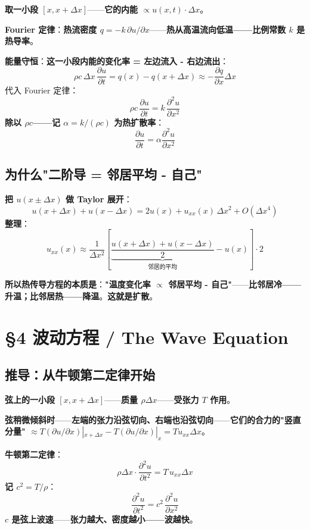 \textbf{取一小段 $[x, x+\Delta x]$}——\textbf{它的内能 $\propto u(x, t) \cdot \Delta x$}。

\textbf{Fourier 定律}：\textbf{热流密度 $q = -k \, \partial u / \partial x$}——\textbf{热从高温流向低温——比例常数 $k$ 是热导率}。

\textbf{能量守恒}：\textbf{这一小段内能的变化率 = 左边流入 - 右边流出}：
\[
\rho c \, \Delta x \, \frac{\partial u}{\partial t} = q(x) - q(x+\Delta x) \approx -\frac{\partial q}{\partial x} \Delta x
\]
代入 Fourier 定律：
\[
\rho c \, \frac{\partial u}{\partial t} = k \, \frac{\partial^2 u}{\partial x^2}
\]
\textbf{除以 $\rho c$——记 $\alpha = k/(\rho c)$ 为\textbf{热扩散率}}：
\begin{equation}
\boxed{\, \frac{\partial u}{\partial t} = \alpha \frac{\partial^2 u}{\partial x^2} \,}
\end{equation}

\subsection{为什么"二阶导 = 邻居平均 - 自己"}

\textbf{把 $u(x \pm \Delta x)$ 做 Taylor 展开}：
\[
u(x+\Delta x) + u(x-\Delta x) = 2 u(x) + u_{xx}(x) \, \Delta x^2 + O(\Delta x^4)
\]
\textbf{整理}：
\[
u_{xx}(x) \approx \frac{1}{\Delta x^2} \left[ \underbrace{\frac{u(x+\Delta x) + u(x-\Delta x)}{2}}_{\text{邻居的平均}} - u(x) \right] \cdot 2
\]

\textbf{所以热传导方程的本质是}：\textbf{"温度变化率 $\propto$ 邻居平均 - 自己"}——\textbf{比邻居冷——升温；比邻居热——降温}。\textbf{这就是扩散}。

\section{§4 波动方程 / The Wave Equation}

\subsection{推导：从牛顿第二定律开始}

\textbf{弦上的一小段 $[x, x+\Delta x]$}——\textbf{质量 $\rho \Delta x$}——\textbf{受张力 $T$ 作用}。

\textbf{弦稍微倾斜时}——\textbf{左端的张力沿弦切向、右端也沿弦切向}——\textbf{它们的合力的"竖直分量" $\approx T(\partial u/\partial x)|_{x+\Delta x} - T(\partial u/\partial x)|_x = T u_{xx} \Delta x$}。

\textbf{牛顿第二定律}：
\[
\rho \Delta x \cdot \frac{\partial^2 u}{\partial t^2} = T \, u_{xx} \Delta x
\]
\textbf{记 $c^2 = T/\rho$}：
\begin{equation}
\boxed{\, \frac{\partial^2 u}{\partial t^2} = c^2 \, \frac{\partial^2 u}{\partial x^2} \,}
\end{equation}
\textbf{$c$ 是弦上波速}——\textbf{张力越大、密度越小——波越快}。


